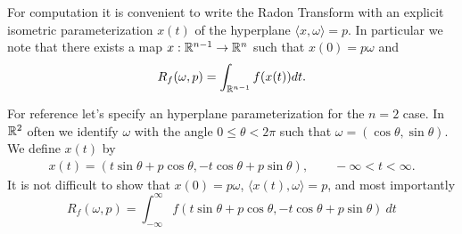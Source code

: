 \begin{myexample}
  For computation it is convenient to write the Radon Transform with an explicit isometric parameterization $x(t)$ of the hyperplane $\langle x, \omega\rangle = p$. In particular we note that there exists a map $x : \mathbb{R}^{n-1} \rightarrow \mathbb{R}^n$ such that $x(0) = p\omega$ and
  \[
    R_f(\omega, p) = \int_{\mathbb{R}^{n-1}} f(x(t)) dt.
  \]

  For reference let's specify an hyperplane parameterization for the $n=2$ case. In $\mathbb{R}^2$ often we identify $\omega$ with the angle $0 \leq \theta < 2\pi$ such that $\omega = (\cos \theta, \sin \theta)$. We define $x(t)$ by
  \begin{align*}
    x(t) = (t \sin \theta + p \cos \theta, -t \cos \theta + p \sin \theta), \qquad -\infty < t < \infty.
  \end{align*}
  It is not difficult to show that $x(0) = p\omega$, $\langle x(t), \omega \rangle = p$, and most importantly
  \[
    R_f(\omega, p) = \int_{-\infty}^\infty f(t \sin \theta + p \cos \theta, -t \cos \theta + p \sin \theta)~dt
  \]
\end{myexample}

